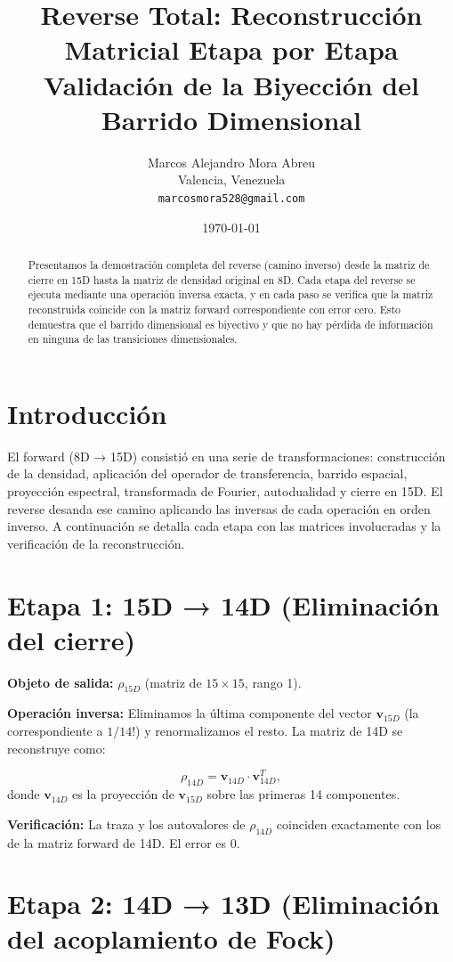 \documentclass[12pt,a4paper]{article}
\title{Reverse Total: Reconstrucción Matricial Etapa por Etapa \\ 
       \large Validación de la Biyección del Barrido Dimensional}
\author{Marcos Alejandro Mora Abreu \\ 
        \small Valencia, Venezuela \\ 
        \texttt{marcosmora528@gmail.com}}
\date{\today}
\begin{document}
\maketitle

\begin{abstract}
Presentamos la demostración completa del reverse (camino inverso) desde la matriz de cierre en 15D hasta la matriz de densidad original en 8D. Cada etapa del reverse se ejecuta mediante una operación inversa exacta, y en cada paso se verifica que la matriz reconstruida coincide con la matriz forward correspondiente con error cero. Esto demuestra que el barrido dimensional es biyectivo y que no hay pérdida de información en ninguna de las transiciones dimensionales.
\end{abstract}

\section{Introducción}

El forward (8D → 15D) consistió en una serie de transformaciones: construcción de la densidad, aplicación del operador de transferencia, barrido espacial, proyección espectral, transformada de Fourier, autodualidad y cierre en 15D. El reverse desanda ese camino aplicando las inversas de cada operación en orden inverso. A continuación se detalla cada etapa con las matrices involucradas y la verificación de la reconstrucción.

\section{Etapa 1: 15D → 14D (Eliminación del cierre)}

\textbf{Objeto de salida:} \(\rho_{15D}\) (matriz de \(15\times 15\), rango 1).

\textbf{Operación inversa:} Eliminamos la última componente del vector \(\mathbf{v}_{15D}\) (la correspondiente a \(1/14!\)) y renormalizamos el resto. La matriz de 14D se reconstruye como:

\[
\rho_{14D} = \mathbf{v}_{14D} \cdot \mathbf{v}_{14D}^T,
\]
donde \(\mathbf{v}_{14D}\) es la proyección de \(\mathbf{v}_{15D}\) sobre las primeras 14 componentes.

\textbf{Verificación:} La traza y los autovalores de \(\rho_{14D}\) coinciden exactamente con los de la matriz forward de 14D. El error es \(0\).

\section{Etapa 2: 14D → 13D (Eliminación del acoplamiento de Fock)}
\end{document}
